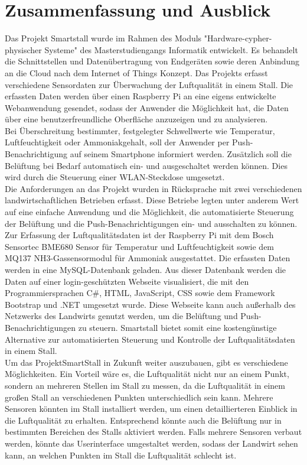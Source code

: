 \documentclass[conference]{IEEEtran}
\begin{document}
\section{Zusammenfassung und Ausblick}
Das Projekt Smartstall wurde im Rahmen des Moduls "Hardware-cypher-physischer Systeme" des Masterstudiengangs Informatik entwickelt. Es behandelt die Schnittstellen und Datenübertragung von Endgeräten sowie deren Anbindung an die Cloud nach dem Internet of Things Konzept. Das Projekts erfasst verschiedene Sensordaten zur Überwachung der Luftqualität in einem Stall. Die erfassten Daten werden über einen Raspberry Pi an eine eigens entwickelte Webanwendung gesendet, sodass der Anwender die Möglichkeit hat, die Daten über eine benutzerfreundliche Oberfläche anzuzeigen und zu analysieren. \\
Bei Überschreitung bestimmter, festgelegter Schwellwerte wie Temperatur, Luftfeuchtigkeit oder Ammoniakgehalt, soll der Anwender per Push-Benachrichtigung auf seinem Smartphone informiert werden. Zusätzlich soll die Belüftung bei Bedarf automatisch ein- und ausgeschaltet werden können. Dies wird durch die Steuerung einer WLAN-Steckdose umgesetzt. \\
Die Anforderungen an das Projekt wurden in Rücksprache mit zwei verschiedenen landwirtschaftlichen Betrieben erfasst. Diese Betriebe legten unter anderem Wert auf eine einfache Anwendung und die Möglichkeit, die automatisierte Steuerung der Belüftung und die Push-Benachrichtigungen ein- und ausschalten zu können. \\
Zur Erfassung der Luftqualitätsdaten ist der Raspberry Pi mit dem Bosch Sensortec BME680 Sensor für Temperatur und Luftfeuchtigkeit sowie dem MQ137 NH3-Gassensormodul für Ammoniak ausgestattet. Die erfassten Daten werden in eine MySQL-Datenbank geladen. Aus dieser Datenbank werden die Daten auf einer login-geschützten Webseite visualisiert, die mit den Programmiersprachen C\#, HTML, JavaScript, CSS sowie dem Framework Bootstrap und .NET umgesetzt wurde. Diese Webseite kann auch außerhalb des Netzwerks des Landwirts genutzt werden, um die Belüftung und Push-Benachrichtigungen zu steuern. Smartstall bietet somit eine kostengünstige Alternative zur automatisierten Steuerung und Kontrolle der Luftqualitätsdaten in einem Stall. \\
Um das ProjektSmartStall in Zukunft weiter auszubauen, gibt es verschiedene Möglichkeiten. Ein Vorteil wäre es, die Luftqualität nicht nur an einem Punkt, sondern an mehreren Stellen im Stall zu messen, da die Luftqualität in einem großen Stall an verschiedenen Punkten unterschiedlich sein kann. Mehrere Sensoren könnten im Stall installiert werden, um einen detaillierteren Einblick in die Luftqualität zu erhalten. Entsprechend könnte auch die Belüftung nur in bestimmten Bereichen des Stalls aktiviert werden. Falls mehrere Sensoren verbaut werden, könnte das Userinterface umgestaltet werden, sodass der Landwirt sehen kann, an welchen Punkten im Stall die Luftqualität schlecht ist. \\
\end{document}
